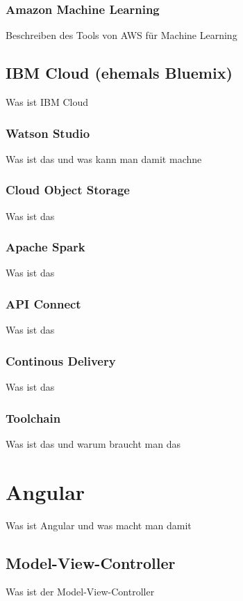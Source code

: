 \subsubsection{Amazon Machine Learning}
Beschreiben des Tools von AWS für Machine Learning

\subsection{IBM Cloud (ehemals Bluemix)}
Was ist IBM Cloud

\subsubsection{Watson Studio}
Was ist das und was kann man damit machne

\subsubsection{Cloud Object Storage}
Was ist das

\subsubsection{Apache Spark}
Was ist das

\subsubsection{API Connect}
Was ist das

\subsubsection{Continous Delivery}
Was ist das

\subsubsection{Toolchain}
Was ist das und warum braucht man das

\section{Angular}
Was ist Angular und was macht man damit

\subsection{Model-View-Controller}
Was ist der Model-View-Controller

